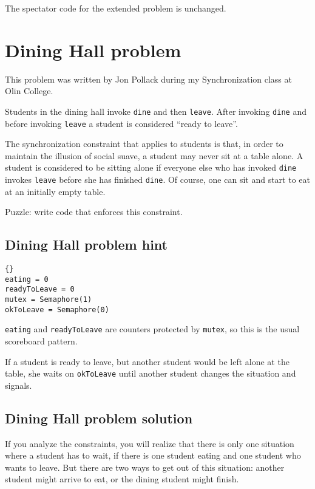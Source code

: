 \documentclass{book}
\newcommand{\clearemptydoublepage}{\newpage\cleardoublepage}
\begin{document}
The spectator code for the extended problem is unchanged.


\clearemptydoublepage
\section{Dining Hall problem}

This problem was written by Jon Pollack during my Synchronization
class at Olin College.  

Students in the dining hall invoke {\tt dine} and then {\tt leave}.
After invoking {\tt dine} and before invoking {\tt leave} a student is
considered ``ready to leave''.

The synchronization constraint that applies to students is that, in
order to maintain the illusion of social suave, a student may never
sit at a table alone.  A student is considered to be sitting alone
if everyone else who has invoked {\tt dine} invokes {\tt leave}
before she has finished {\tt dine}. Of course, one can sit and
start to eat at an initially empty table.

Puzzle: write code that enforces this constraint.


\clearemptydoublepage
\subsection {Dining Hall problem hint}

\begin{lstlisting}[title={Dining Hall problem hint}]{}
eating = 0
readyToLeave = 0
mutex = Semaphore(1)
okToLeave = Semaphore(0)
\end{lstlisting}

{\tt eating} and {\tt readyToLeave} are
counters protected by {\tt mutex}, so this is the usual
scoreboard pattern.

If a student is ready to leave, but another student would be
left alone at the table, she waits on
{\tt okToLeave} until another student changes
the situation and signals.


\clearemptydoublepage
\subsection {Dining Hall problem solution}

If you analyze the constraints, you will realize that there
is only one situation where a student has to wait, if there is
one student eating and one student who wants to leave.  But
there are two ways to get out of this situation: another
student might arrive to eat, or the dining student might 
finish.
\end{document}
